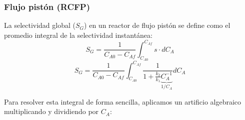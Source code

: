 \subsubsection{Flujo pistón (RCFP)}
\noindent La selectividad global ($S_G$) en un reactor de flujo pistón se define como el promedio integral de la selectividad instantánea:
\begin{equation}
  \boxed{ S_G = \frac{1}{C_{A0}-C_{Af}} \int_{C_{A0}}^{C_{Af}} s\cdot dC_A }
\end{equation}
\begin{equation}
  S_G = \frac{1}{C_{A0}-C_{Af}} \int_{C_{A0}}^{C_{Af}} \frac{1}{1 + \frac{k_2}{k_1} \underbrace{C_A^{-1}}_{1/C_A}} dC_A
\end{equation}

\noindent Para resolver esta integral de forma sencilla, aplicamos un artificio algebraico multiplicando y dividiendo por $C_A$:

